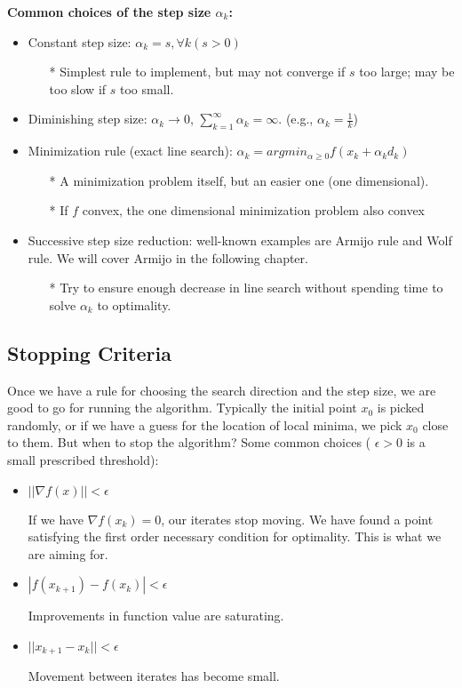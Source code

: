 \noindent \textbf{Common choices of the step size $\alpha_k$: }
\begin{itemize}
    \item Constant step size: $\alpha_k=s,\forall k(s>0)$
        \begin{itemize}
            \item[*] Simplest rule to implement, but may not converge if $s$ too large; may
            be too slow if $s$ too small.
        \end{itemize}
    \item Diminishing step size: $\alpha_k\rightarrow 0$, $\sum\limits_{k=1}^{\infty}\alpha_k = \infty$. (e.g., $\alpha_k=\frac{1}{k}$)
    \item Minimization rule (exact line search): $\alpha_k = argmin_{\alpha\geq 0} f(x_k+\alpha_k d_k)$
        \begin{itemize}
            \item[*] A minimization problem itself, but an easier one (one dimensional).
            \item[*] If $f$ convex, the one dimensional minimization problem also convex  
        \end{itemize}
    \item Successive step size reduction: well-known examples are Armijo rule
    and Wolf rule. We will cover Armijo
    in the following chapter.
        \begin{itemize}
            \item[*] Try to ensure enough decrease in line search without spending time
            to solve $\alpha_k$ to optimality.
        \end{itemize}
\end{itemize}

\subsection{Stopping Criteria}
Once we have a rule for choosing the search direction and the step size,
we are good to go for running the algorithm. Typically the initial point $x_0$ is picked randomly, or if we have a guess for
the location of local minima, we pick $x_0$ close to them. But when to stop the algorithm? Some common choices ( $\epsilon>0$ is a small prescribed threshold):
\begin{itemize}
    \item $||\nabla f(x)||<\epsilon$
    \item[]  {If we have $\nabla f(x_k)=0$, our iterates stop moving. 
    We have found a point satisfying the first order necessary condition for optimality. 
    This is what we are aiming for. }
    \item $|f(x_{k+1})-f(x_k)|<\epsilon$
    \item[]  Improvements in function value are saturating.
    \item $||x_{k+1}-x_k||<\epsilon$
    \item[] Movement between iterates has become small.
\end{itemize}






